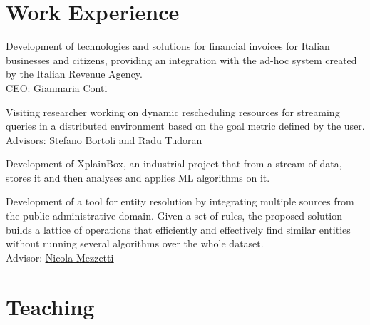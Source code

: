 \documentclass[10pt,a4paper,colorlinks,linkcolor=true]{moderncv}
\newcommand{\cvlink}[2]{\href{#1}{\ul{#2}}}
\begin{document}



\section{Work Experience}

  {Development of technologies and solutions for financial invoices for Italian businesses and citizens, providing an integration with the ad-hoc system created by the Italian Revenue Agency.\\
  CEO: \cvlink{https://www.linkedin.com/in/gianmaria-conti-38303712/}{Gianmaria Conti}}

  {Visiting researcher working on dynamic rescheduling resources for streaming queries in a distributed environment based on the goal metric defined by the user.\\
  Advisors: \cvlink{https://www.linkedin.com/in/stefano-bortoli/}{Stefano Bortoli} and \cvlink{https://www.linkedin.com/in/radu-tudoran-37545643/}{Radu Tudoran}}

  {Development of XplainBox, an industrial project that from a stream of data, stores it and then analyses and applies ML algorithms on it.}

  {Development of a tool for entity resolution by integrating multiple sources from the public administrative domain. Given a set of rules, the proposed solution builds a lattice of operations that efficiently and effectively find similar entities without running several algorithms over the whole dataset.\\
  Advisor: \cvlink{https://www.linkedin.com/in/nicolamezzetti/}{Nicola Mezzetti}}


\section{Teaching}
\end{document}
